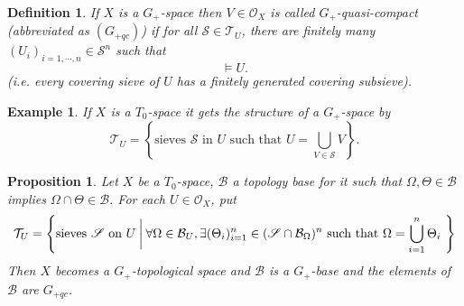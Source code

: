 \documentclass[8pt]{article}
\numberwithin{equation}{section}
\newtheorem{proposition}{Proposition}[subsection]
\newtheorem{definition}{Definition}[subsection]
\newtheorem{example}{Example}[subsection]
\newcommand{\Ouv}{\mathscr{O}}
\newcommand{\sS}[0]{\mathscr{S}}
\newcommand{\cB}[0]{\mathcal{B}}
\begin{document}
\begin{definition}
    \label{definition_9_6}
    If $X$ is a $G_+$-space then $V\in\Ouv_X$ is called $G_+$-quasi-compact (abbreviated as $(G_{+qc})$) if for all $\sS\in\mathcal{T}_U$, there are finitely many $(U_i)_{i=1,\cdots,n}\in\sS^n$ such that 
    \begin{equation*}
        [U_1,\cdots,U_n]\vDash U.
    \end{equation*}
    (i.e. every covering sieve of $U$ has a finitely generated covering subsieve).
\end{definition}
\begin{example}
    If $X$ is a $T_0$-space it gets the structure of a $G_+$-space by
    \begin{equation*}
    \mathcal{T}_U=\left\{\text{sieves $\sS$ in $U$ such that $U = \bigcup_{V\in \sS}V$}\right\}.
    \end{equation*}
\end{example}
\begin{proposition}
    \label{proposition_9_2}
    Let $X$ be a $T_0$-space, $\cB$ a topology base for it such that $\Omega,\Theta\in\cB$ implies $\Omega\cap\Theta\in\cB$. For each $U\in\Ouv_X$, put
    \begin{equation*}
        \mathcal{T}_U = \left\{\text{sieves $\sS$ on $U$}\:\bigg{|}\:\forall \Omega\in\cB_U,\exists (\Theta_i)_{i=1}^n\in(\sS\cap\cB_\Omega)^n\text{ such that $\Omega=\bigcup_{i=1}^n\Theta_i$ }\right\}
    \end{equation*}
    Then $X$ becomes a $G_+$-topological space and $\cB$ is a $G_+$-base and the elements of $\cB$ are $G_{+qc}$.
\end{proposition}
\end{document}

